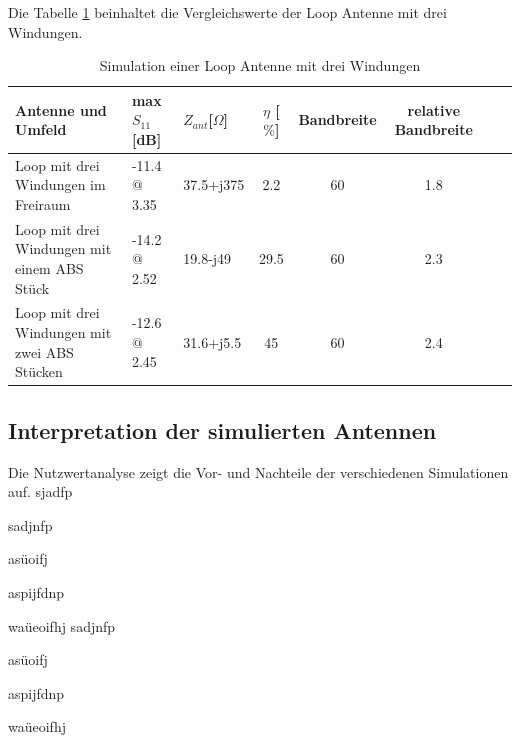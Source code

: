 Die Tabelle \ref{tab:Evaluation_Vergeich_Loop_Antennen_Coil} beinhaltet die Vergleichswerte der Loop Antenne mit drei Windungen.
\begin{table}[!h]
  \centering
  \begin{tabular}{p{4cm} p{2cm} l  c c c c r} 
  \toprule 
  Antenne und Umfeld             & max $S_{11}$[dB]		& $Z_{ant}$[$\Omega$] 	& $\eta$ [$\%$] & Bandbreite & relative Bandbreite\\ 
  \midrule
Loop mit drei Windungen  im Freiraum    		&	-11.4 @ 3.35		&  	37.5+j375			&   	2.2	& 60		& 1.8\\          					   		
Loop mit drei Windungen mit einem ABS Stück 	&    -14.2 @ 2.52  		&	19.8-j49			&	29.5	& 60	 	& 2.3\\
Loop mit drei Windungen mit zwei ABS Stücken &    -12.6 @ 2.45    	&	31.6+j5.5		&	45	& 60 	& 2.4\\
 \bottomrule
  \end{tabular}
  \caption{Simulation einer Loop Antenne mit drei Windungen }
  \label{tab:Evaluation_Vergeich_Loop_Antennen_Coil}
\end{table}
\subsection{Interpretation der simulierten Antennen}

Die Nutzwertanalyse zeigt die Vor- und Nachteile der verschiedenen Simulationen auf.
sjadfp

sadjnfp

asüoifj

aspijfdnp


waüeoifhj
sadjnfp

asüoifj

aspijfdnp


waüeoifhj

\newpage
